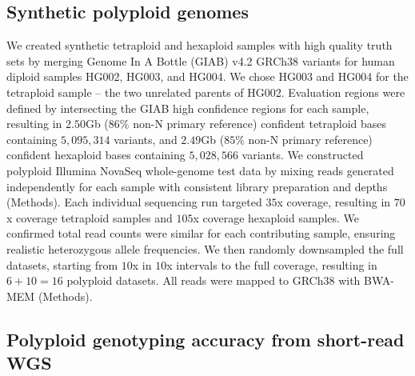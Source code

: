 \documentclass[notitlepage, twocolumn, 10pt]{article}
\begin{document}
\subsection*{Synthetic polyploid genomes} We created synthetic tetraploid and hexaploid samples with high quality truth sets by merging Genome In A Bottle \cite{RN651} (GIAB) v4.2 GRCh38 variants for human diploid samples HG002, HG003, and HG004. We chose HG003 and HG004 for the tetraploid sample -- the two unrelated parents of HG002. Evaluation regions were defined by intersecting \cite{RN757} the GIAB high confidence regions for each sample, resulting in $2.50$Gb ($86\%$ non-N primary reference) confident tetraploid bases containing $5,095,314$ variants, and $2.49$Gb ($85\%$ non-N primary reference) confident hexaploid bases containing $5,028,566$ variants. We constructed polyploid Illumina NovaSeq whole-genome test data by mixing reads generated independently for each sample with consistent library preparation and depths (Methods). Each individual sequencing run targeted $35$x coverage, resulting in $70$x coverage tetraploid samples and $105$x coverage hexaploid samples. We confirmed total read counts were similar for each contributing sample, ensuring realistic heterozygous allele frequencies. We then randomly downsampled the full datasets, starting from $10$x in $10$x intervals to the full coverage, resulting in $6 + 10 = 16$ polyploid datasets. All reads were mapped to GRCh38 with BWA-MEM \cite{RN539} (Methods).

\subsection*{Polyploid genotyping accuracy from short-read WGS}
\end{document}
